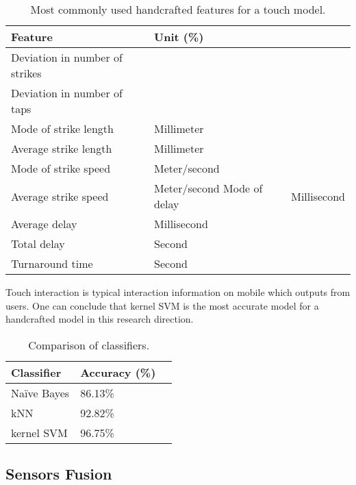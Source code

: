 \begin{table}
  \caption{Most commonly used handcrafted features for a touch model.}
  \label{tab:touch-feature}
  \scriptsize
  \begin{center}
    \begin{tabular}{lll}
      Feature & Unit (\%)\\
    \hline
    Deviation in number of strikes & \\
    Deviation in number of taps & \\
    Mode of strike length & Millimeter \\
    Average strike length & Millimeter \\ 
    Mode of strike speed  & Meter/second \\ 
    Average strike speed  & Meter/second
    Mode of delay & Millisecond \\
    Average delay & Millisecond \\ 
    Total delay   & Second\\
    Turnaround time & Second\\
    \end{tabular}
  \end{center}
\end{table}

Touch interaction is typical interaction information on mobile which outputs from users.
One can conclude that kernel SVM is the most accurate model for a handcrafted model in this research direction.

\begin{table}
  \caption{Comparison of classifiers.}
  \label{tab:touch-cls}
  \scriptsize
  \begin{center}
    \begin{tabular}{lll}
      Classifier & Accuracy (\%) \\
    \hline
    Naïve Bayes     & 86.13\%           \\
    kNN                & 92.82\%       \\
    kernel SVM                 & 96.75\%         \\
    \end{tabular}
  \end{center}
\end{table}

\subsection{Sensors Fusion}\label{subsec:fusion}

